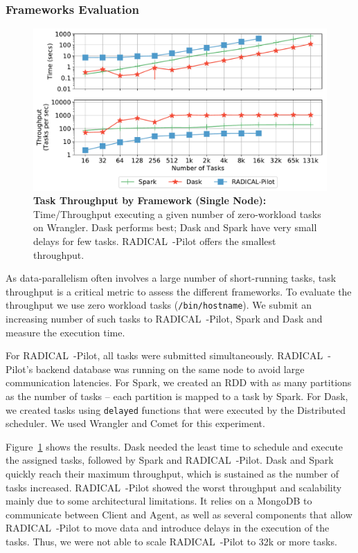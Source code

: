 \subsubsection{Frameworks Evaluation}
\label{sec:framework_eval}

\begin{figure}[t]
    \centering
    \includegraphics[width=.95\textwidth]{figures/data_analytics_hpc/task_par/dask_spark_rp_wrangler.pdf}
    \caption{\textbf{Task Throughput by Framework (Single Node):} 
        Time/Throughput executing a given number of zero-workload tasks on Wrangler.
        Dask performs best; Dask and Spark have very small delays for few tasks.
        RADICAL~-Pilot offers the smallest throughput.}
    \label{fig:dask_spark_rp_wrangler}
\end{figure}

As data-parallelism often involves a large number of short-running tasks, task throughput is a critical metric to assess the different frameworks.
To evaluate the throughput we use zero workload tasks (\texttt{/bin/hostname}).
We submit an increasing number of such tasks to RADICAL~-Pilot, Spark and Dask and measure the execution time.

For RADICAL~-Pilot, all tasks were submitted simultaneously. RADICAL~-Pilot's backend database was running on the same node to avoid large communication latencies.
For Spark, we created an RDD with as many partitions as the number of tasks -- each partition is mapped to a task by Spark.
For Dask, we created tasks using \texttt{delayed} functions that were executed by the Distributed scheduler.
We used Wrangler and Comet for this experiment.

Figure~\ref{fig:dask_spark_rp_wrangler} shows the results.
Dask needed the least time to schedule and execute the assigned tasks, followed by Spark and RADICAL~-Pilot.
Dask and Spark quickly reach their maximum throughput, which is sustained as the number of tasks increased.
RADICAL~-Pilot showed the worst throughput and scalability mainly due to some architectural limitations.
It relies on a MongoDB to communicate between Client and Agent, as well as several components that allow RADICAL~-Pilot to move data and introduce delays in the execution of the tasks.
Thus, we were not able to scale RADICAL~-Pilot to 32k or more tasks.

